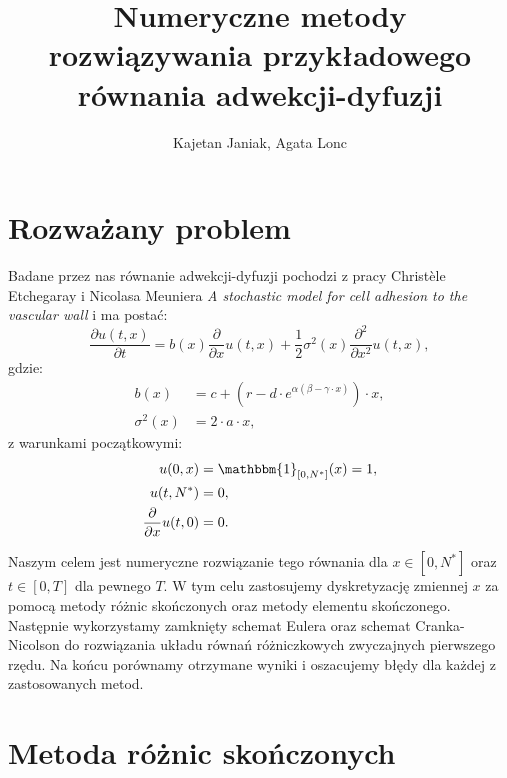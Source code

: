 \documentclass{article}
\title{Numeryczne metody rozwiązywania przykładowego równania adwekcji-dyfuzji}
\author{Kajetan Janiak, Agata Lonc}
\begin{document}
\maketitle
\section{Rozważany problem}
Badane przez nas równanie adwekcji-dyfuzji pochodzi z pracy Christèle Etchegaray i Nicolasa Meuniera \textit{A stochastic model for cell adhesion to the vascular wall} i ma postać:
\begin{equation}\label{rownanie}
\frac{\partial u(t, x)}{\partial t} = b(x) \frac{\partial}{\partial x} u(t, x) + \frac{1}{2} \sigma^{2}(x) \frac{\partial^{2}}{\partial {x}^{2}} u(t,x),
\end{equation}
gdzie:
\begin{align*}
b(x) &= c + (r - d\cdot e^{\alpha(\beta - \gamma \cdot x)})\cdot x, \\
\sigma^{2}(x) &= 2\cdot a \cdot x,
\end{align*}
z warunkami początkowymi:
\begin{align*}
u(0, x) &= \mathbbm{1}_{\lbrack 0, N^{*} \rbrack } (x) = 1, \\
u(t, N^{*}) &= 0, \\
\frac{\partial}{\partial x} u(t, 0) &= 0. 
\end{align*}

Naszym celem jest numeryczne rozwiązanie tego równania dla $x\in[0,N^{*}]$ oraz $t\in[0,T]$ dla pewnego $T$. W tym celu zastosujemy dyskretyzację zmiennej $x$ za pomocą metody różnic skończonych oraz metody elementu skończonego. Następnie wykorzystamy zamknięty schemat Eulera oraz schemat Cranka-Nicolson do rozwiązania układu równań różniczkowych zwyczajnych pierwszego rzędu. Na końcu porównamy otrzymane wyniki i oszacujemy błędy dla każdej z zastosowanych metod.




\section{Metoda różnic skończonych}
\end{document}
